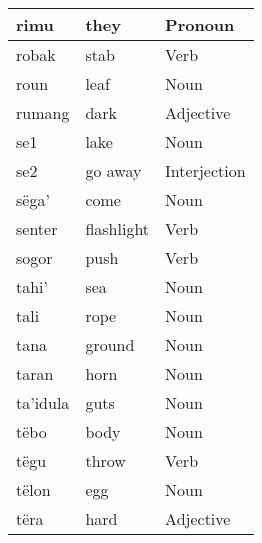 \documentclass{article}
\begin{document}
\begin{longtable}{|l|l|l|}
\multirow{-2}{*}{rimu}  & they                & \multirow{-2}{*}{{\color[HTML]{009901} Pronoun}}   \\ \hline
robak                   & stab                & {\color[HTML]{009901} Verb}                        \\ \hline
roun                    & leaf                & {\color[HTML]{009901} Noun}                        \\ \hline
rumang                  & dark                & {\color[HTML]{009901} Adjective}                   \\ \hline
se1                     & lake                & {\color[HTML]{009901} Noun}                        \\ \hline
se2                     & go away             & {\color[HTML]{009901} Interjection}                \\ \hline
sëga'                   & come                & {\color[HTML]{009901} Noun}                        \\ \hline
senter                  & flashlight          & {\color[HTML]{009901} Verb}                        \\ \hline
sogor                   & push                & {\color[HTML]{009901} Verb}                        \\ \hline
tahi'                   & sea                 & {\color[HTML]{009901} Noun}                        \\ \hline
tali                    & rope                & {\color[HTML]{009901} Noun}                        \\ \hline
tana                    & ground              & {\color[HTML]{009901} Noun}                        \\ \hline
taran                   & horn                & {\color[HTML]{009901} Noun}                        \\ \hline
ta'idula                & guts                & {\color[HTML]{009901} Noun}                        \\ \hline
tëbo                    & body                & {\color[HTML]{009901} Noun}                        \\ \hline
tëgu                    & throw               & {\color[HTML]{009901} Verb}                        \\ \hline
tëlon                   & egg                 & {\color[HTML]{009901} Noun}                        \\ \hline
tëra                    & hard                & {\color[HTML]{009901} Adjective}                   \\ \hline

\end{longtable}
\end{document}
